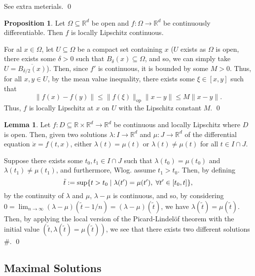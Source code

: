 \documentclass[
]{article}
\theoremstyle{definition}
\newtheorem{prop}{Proposition}
\theoremstyle{definition}
\newtheorem{lemma}{Lemma}[section]
\begin{document}
See extra meterials. \qed

\begin{prop}
  Let \(\Omega \subseteq \mathbb{R}^d\) be open and \(f : \Omega \to \mathbb{R}^d\) 
  be continuously differentiable. Then \(f\) is locally Lipschitz continuous.
\end{prop}
\proof

For al \(x \in \Omega\), let \(U \subseteq \Omega\) be a compact set
containing \(x\) (\(U\) exists as \(\Omega\) is open, there exists some
\(\delta > 0\) such that \(B_\delta(x) \subseteq \Omega\), and so, we
can simply take \(U = \overline{B_{\delta / 2}(x)}\)). Then, since
\(f'\) is continuous, it is bounded by some \(M > 0\). Thus, for all
\(x, y \in U\), by the mean value inequality, there exists some
\(\xi \in [x, y]\) such that
\[\|f(x) -f(y)\| \le \|f(\xi)\|_{\text{op}}\|x - y\| \le M \|x - y\|.\]
Thus, \(f\) is locally Lipschitz at \(x\) on \(U\) with the Lipschitz
constant \(M\). \qed

\begin{lemma}
  Let \(f : D \subseteq \mathbb{R} \times \mathbb{R}^d \to \mathbb{R}^d\) be continuous 
  and locally Lipschitz where \(D\) is open. Then, given two solutions 
  \(\lambda : I \to \mathbb{R}^d\) and \(\mu : J \to \mathbb{R}^d\) of 
  the differential equation \(\dot x = f(t, x)\), either \(\lambda(t) = \mu(t)\) 
  or \(\lambda(t) \neq \mu(t)\) for all \(t \in I \cap J\).
\end{lemma}
\proof

Suppose there exists some \(t_0, t_1 \in I \cap J\) such that
\(\lambda(t_0) = \mu(t_0)\) and \(\lambda(t_1) \neq \mu(t_1)\), and
furthermore, Wlog. assume \(t_1 > t_0\). Then, by defining
\[\tilde t := \sup \{t > t_0 \mid \lambda(t') = \mu(t'), 
    \hspace{1mm} \forall t' \in [t_0, t]\},\] by the continuity of
\(\lambda\) and \(\mu\), \(\lambda - \mu\) is continuous, and so, by
considering
\(0 = \lim_{n \to \infty} (\lambda - \mu)(\tilde t - 1 / n) =  (\lambda - \mu)(\tilde t)\),
we have \(\lambda(\tilde t) = \mu(\tilde t)\). Then, by applying the
local version of the Picard-Lindelöf theorem with the initial value
\((\tilde t, \lambda(\tilde t) = \mu(\tilde t))\), we see that there
exists two different solutions \#. \qed

\hypertarget{maximal-solutions}{%
\subsection{Maximal Solutions}\label{maximal-solutions}}
\end{document}
